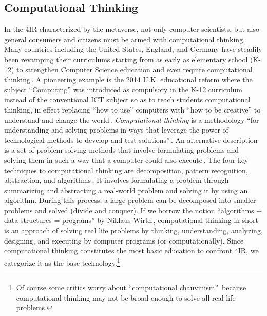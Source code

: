\documentclass[11pt]{article}
\begin{document}
\subsection{Computational Thinking}
In the 4IR characterized by the metaverse, not only computer scientists, but also general consumers and citizens must be armed with computational thinking. Many countries including the United States, England, and Germany have steadily been revamping their curriculums starting from as early as elementary school (K-12) to strengthen Computer Science education and even require computational thinking\,\cite{10.1145/1929887.1929905,Berry14,DBLP:books/sp/17/DelckerI17,DBLP:books/sp/RH2017}. 
A pioneering example is the 2014 U.K. educational reform where the subject ``Computing'' was introduced as compulsory in the K-12 curriculum instead of the conventional ICT subject so as to teach students computational thinking, in effect replacing ``how to use'' computers with ``how to be creative'' to understand and change the world\,\cite{Berry14}. 
\emph{Computational thinking} is a methodology ``for understanding and solving problems in ways that leverage the power of technological methods to develop and test solutions''\,\cite{iste2016}.
An alternative description is a set of problem-solving methods that involve formulating problems and solving them in such a way that a computer could also execute\,\cite{wiki-computational-thinking}. 
The four key techniques to computational thinking are decomposition, pattern recognition, abstraction, and algorithms\,\cite{BBC2022}. It involves formulating a problem through summarizing and abstracting a real-world problem and solving it by using an algorithm. During this process, a large problem can be decomposed into smaller problems and solved (divide and conquer). If we borrow the notion ``algorithms + data structures = programs'' by Niklaus Wirth\,\cite{Wirth1976}, computational thinking in short is an approach of solving real life problems by thinking, understanding, analyzing, designing, and executing by computer programs (or computationally).
Since computational thinking constitutes the most basic education to confront 4IR, we categorize it as the base technology.\footnote{Of course some critics worry about ``computational chauvinism''\,\cite{DBLP:journals/cacm/DenningTY17} because computational thinking may not be broad enough to solve all real-life problems.}
\end{document}
